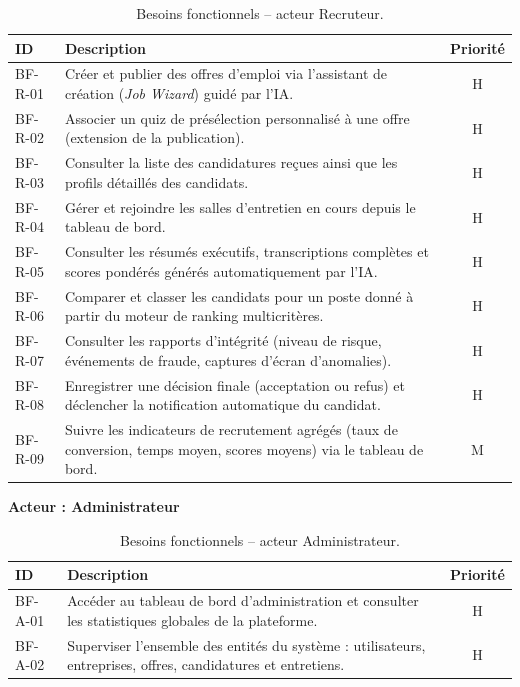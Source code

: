\begin{table}[H]
  \centering
  \footnotesize
  \renewcommand{\arraystretch}{1.3}
  \begin{tabularx}{\textwidth}{|p{1.5cm}|X|c|}
    \hline
    \textbf{ID} & \textbf{Description} & \textbf{Priorité} \\
    \hline
    BF-R-01 & Créer et publier des offres d'emploi via l'assistant de création (\textit{Job Wizard}) guidé par l'IA. & H \\
    \hline
    BF-R-02 & Associer un quiz de présélection personnalisé à une offre (extension de la publication). & H \\
    \hline
    BF-R-03 & Consulter la liste des candidatures reçues ainsi que les profils détaillés des candidats. & H \\
    \hline
    BF-R-04 & Gérer et rejoindre les salles d'entretien en cours depuis le tableau de bord. & H \\
    \hline
    BF-R-05 & Consulter les résumés exécutifs, transcriptions complètes et scores pondérés générés automatiquement par l'IA. & H \\
    \hline
    BF-R-06 & Comparer et classer les candidats pour un poste donné à partir du moteur de ranking multicritères. & H \\
    \hline
    BF-R-07 & Consulter les rapports d'intégrité (niveau de risque, événements de fraude, captures d'écran d'anomalies). & H \\
    \hline
    BF-R-08 & Enregistrer une décision finale (acceptation ou refus) et déclencher la notification automatique du candidat. & H \\
    \hline
    BF-R-09 & Suivre les indicateurs de recrutement agrégés (taux de conversion, temps moyen, scores moyens) via le tableau de bord. & M \\
    \hline
  \end{tabularx}
  \caption{Besoins fonctionnels -- acteur Recruteur.}
  \label{tab:bf-recruteur}
\end{table}

\bigskip
\noindent\textbf{Acteur : Administrateur}

\begin{table}[H]
  \centering
  \footnotesize
  \renewcommand{\arraystretch}{1.3}
  \begin{tabularx}{\textwidth}{|p{1.5cm}|X|c|}
    \hline
    \textbf{ID} & \textbf{Description} & \textbf{Priorité} \\
    \hline
    BF-A-01 & Accéder au tableau de bord d'administration et consulter les statistiques globales de la plateforme. & H \\
    \hline
    BF-A-02 & Superviser l'ensemble des entités du système : utilisateurs, entreprises, offres, candidatures et entretiens. & H \\
    \hline
  \end{tabularx}
  \caption{Besoins fonctionnels -- acteur Administrateur.}
  \label{tab:bf-admin}
\end{table}

